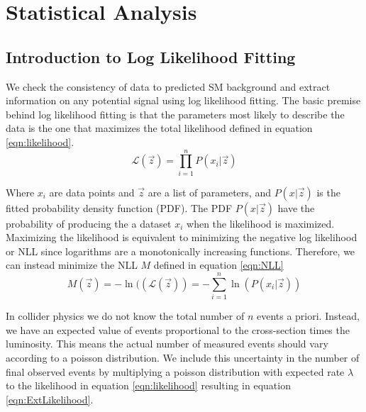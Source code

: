 \chapter{Statistical Analysis}
\label{chap:statistics}

\section{Introduction to Log Likelihood Fitting}
\label{sec:stat:likelihood}

\indent We check the consistency of data to predicted SM background and extract information on any potential signal using log likelihood fitting.  The basic premise behind log likelihood fitting is that the parameters most likely to describe the data is the one that maximizes the total likelihood defined in equation \ref{eqn:likelihood}.  \\

\begin{equation}
\label{eqn:likelihood}
{\mathcal{L}}(\vec{z}) = {\displaystyle\prod_{i=1}^{n}} P(x_i|\vec{z})
\end{equation}

\indent Where $x_i$ are data points and $\vec{z}$ are a list of parameters, and $P(x|\vec{z})$ is the fitted probability density function (PDF).  The PDF $P(x|\vec{z})$ have the probability of producing the a dataset $x_i$ when the likelihood is maximized. \\

\indent Maximizing the likelihood is equivalent to minimizing the negative log likelihood or NLL since logarithms are a monotonically increasing functions.  Therefore, we can instead minimize the NLL $M$ defined in equation \ref{eqn:NLL} \\

\begin{equation}
\label{eqn:NLL}
M(\vec{z})=-\ln(({\mathcal{L}}(\vec{z})) = -{\displaystyle\sum_{i=1}^{n}} \ln( P(x_i|\vec{z}) )
\end{equation}

\indent In collider physics we do not know the total number of $n$ events a priori.  Instead, we have an expected value of events proportional to the cross-section times the luminosity.  This means the actual number of measured events should vary according to a poisson distribution.  We include this uncertainty in the number of final observed events by multiplying a poisson distribution with expected rate $\lambda$ to the likelihood in equation \ref{eqn:likelihood} resulting in equation \ref{eqn:ExtLikelihood}.  \\

